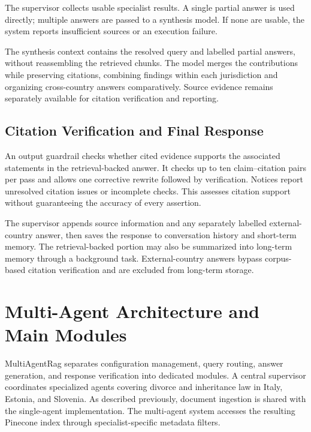 \documentclass[a4paper,12pt]{report}
\begin{document}
The supervisor collects usable specialist results. A single partial
answer is used directly; multiple answers are passed to a synthesis
model. If none are usable, the system reports insufficient sources
or an execution failure.

The synthesis context contains the resolved query and labelled partial
answers, without reassembling the retrieved chunks. The model merges
the contributions while preserving citations, combining findings
within each jurisdiction and organizing cross-country answers
comparatively. Source evidence remains separately available for
citation verification and reporting.

\subsection{Citation Verification and Final Response}

An output guardrail checks whether cited evidence supports the
associated statements in the retrieval-backed answer. It checks up to
ten claim--citation pairs per pass and allows one corrective rewrite
followed by verification. Notices report unresolved citation issues
or incomplete checks. This assesses citation support without
guaranteeing the accuracy of every assertion.

The supervisor appends source information and any separately labelled
external-country answer, then saves the response to conversation
history and short-term memory. The retrieval-backed portion may also
be summarized into long-term memory through a background task.
External-country answers bypass corpus-based citation verification
and are excluded from long-term storage.





\section{Multi-Agent Architecture and Main Modules}
\label{sec:overall_architecture}

MultiAgentRag separates configuration management, query routing,
answer generation, and response verification into dedicated modules.
A central supervisor coordinates specialized agents covering divorce
and inheritance law in Italy, Estonia, and Slovenia. As described
previously, document ingestion is shared with the single-agent
implementation. The multi-agent system accesses the resulting
Pinecone index through specialist-specific metadata filters.
\end{document}
